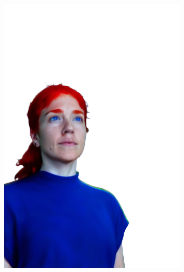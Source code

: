 \begin{figure}[ht]
\begin{subfigure}{0.08\linewidth}
        \includegraphics[width=\textwidth]{Figures/results/high/irene_red/11_render.png}

\end{subfigure}
\end{figure}
